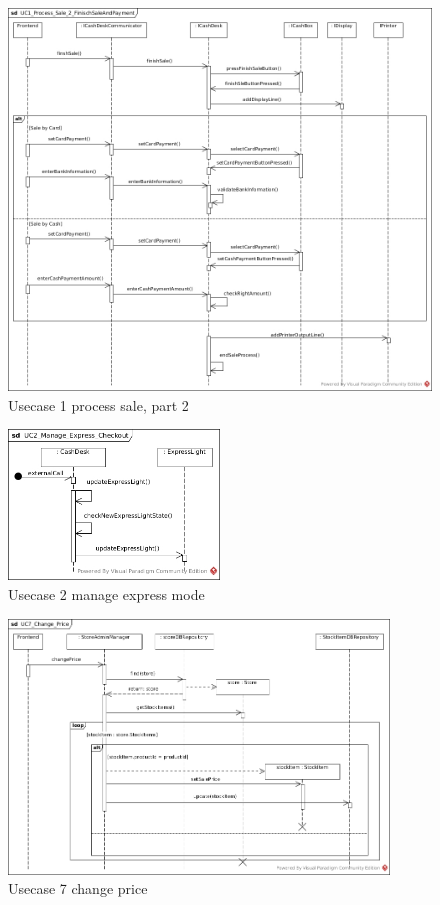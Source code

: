 			\begin{figure}[!h]
				\centering
				\includegraphics[width = 1\textwidth]{img/UC1_Process_Sale_2_FinishSaleAndPayment.jpg}
				\caption{Usecase 1 process sale, part 2}
				\label{MS_UC1_2}
			\end{figure}
			
			\begin{figure}[!h]
				\centering
				\includegraphics[width = 0.5\textwidth]{img/UC2_Manage_Express_Checkout.jpg}
				\caption{Usecase 2 manage express mode}
				\label{MS_UC2}
			\end{figure}
			
			\begin{figure}[!h]
				\centering
				\includegraphics[width = 0.9\textwidth]{img/UC7_Change_Price.jpg}
				\caption{Usecase 7 change price}
				\label{MS_UC7}
			\end{figure}
			
